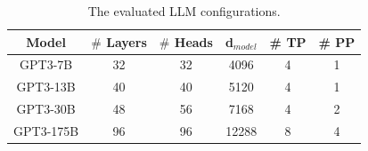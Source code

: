 \begin{table}[]
\renewcommand{\arraystretch}{1.1}
\centering
\caption{The evaluated LLM configurations.}
\vspace{-2ex}
\label{tab:model-config}
\footnotesize
\begin{tabular}{c|ccc|cc}
\hline
\textbf{Model}     
& \textbf{$\#$ Layers}
& \textbf{$\#$ Heads}
& \textbf{d$_{model}$}
& \textbf{\# TP}
& \textbf{\# PP}
\\ \hline

GPT3-7B & 32 & 32 & 4096 & 4 & 1 \\
GPT3-13B  & 40 & 40 & 5120 & 4 & 1 \\
GPT3-30B  & 48 & 56 & 7168 & 4 & 2 \\
GPT3-175B & 96 & 96 & 12288 & 8 & 4 \\ 
\hline
\end{tabular}
\vspace{-2ex}
\end{table}
